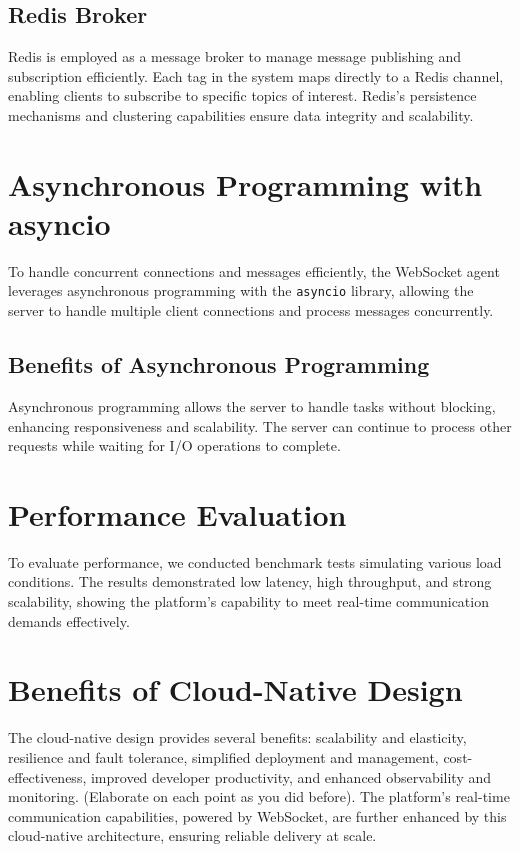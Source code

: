 \documentclass[a4paper, 11pt]{article}
\begin{document}
\subsection{Redis Broker}
Redis is employed as a message broker to manage message publishing and subscription efficiently. Each tag in the system maps directly to a Redis channel, enabling clients to subscribe to specific topics of interest. Redis’s persistence mechanisms and clustering capabilities ensure data integrity and scalability.

\section{Asynchronous Programming with asyncio}
To handle concurrent connections and messages efficiently, the WebSocket agent leverages asynchronous programming with the \texttt{asyncio} library, allowing the server to handle multiple client connections and process messages concurrently.

\subsection{Benefits of Asynchronous Programming}
Asynchronous programming allows the server to handle tasks without blocking, enhancing responsiveness and scalability. The server can continue to process other requests while waiting for I/O operations to complete.

\section{Performance Evaluation}
To evaluate performance, we conducted benchmark tests simulating various load conditions. The results demonstrated low latency, high throughput, and strong scalability, showing the platform's capability to meet real-time communication demands effectively.
\section{Benefits of Cloud-Native Design}

The cloud-native design provides several benefits: scalability and elasticity, resilience and fault tolerance, simplified deployment and management, cost-effectiveness, improved developer productivity, and enhanced observability and monitoring.  (Elaborate on each point as you did before).  The platform's real-time communication capabilities, powered by WebSocket, are further enhanced by this cloud-native architecture, ensuring reliable delivery at scale.
\end{document}
